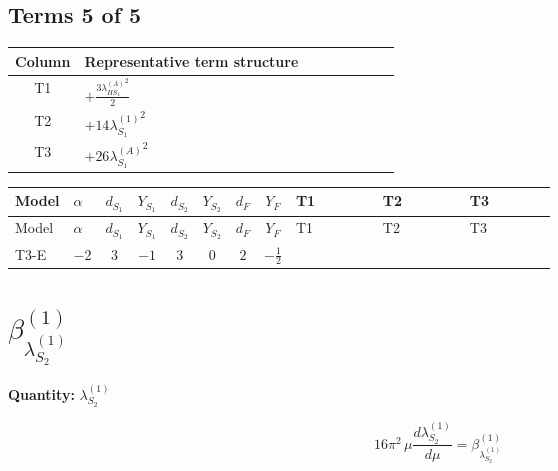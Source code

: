 \documentclass[8pt]{article}
\begin{document}
\begin{landscape}
\subsection*{Terms 5 of 5}
\begin{center}
\begin{tabular}{@{}c >{\raggedright\arraybackslash}p{0.82\linewidth}@{}}
\toprule
Column & Representative term structure \\
\midrule
T1 & \(\displaystyle +\frac{3 {\lambda_{HS_1}^{(A)}}^2}{2}\) \\
\midrule
T2 & \(\displaystyle +14 {\lambda_{S_1}^{(1)}}^2\) \\
\midrule
T3 & \(\displaystyle +26 {\lambda_{S_1}^{(A)}}^2\) \\
\midrule
\bottomrule
\end{tabular}
\end{center}
\smallskip
\tiny
\begin{longtable}{@{}llcccccc >{\raggedright\arraybackslash}p{0.21\linewidth} >{\raggedright\arraybackslash}p{0.21\linewidth} >{\raggedright\arraybackslash}p{0.21\linewidth}@{}}
\toprule
Model & $\alpha$ & $d_{S_1}$ & $Y_{S_1}$ & $d_{S_2}$ & $Y_{S_2}$ & $d_F$ & $Y_F$ & T1 & T2 & T3 \\
\midrule
\endfirsthead
\toprule
Model & $\alpha$ & $d_{S_1}$ & $Y_{S_1}$ & $d_{S_2}$ & $Y_{S_2}$ & $d_F$ & $Y_F$ & T1 & T2 & T3 \\
\midrule
\endhead
T3-E & $-2$ & $3$ & $-1$ & $3$ & $0$ & $2$ & $-\frac{1}{2}$ & \scriptsize\adjustbox{max width=\linewidth}{$\begin{gathered} +\frac{3 {\lambda_{HS_1}^{(A)}}^2}{2}\end{gathered}$} & \scriptsize\adjustbox{max width=\linewidth}{$\begin{gathered} +14 {\lambda_{S_1}^{(1)}}^2\end{gathered}$} & \scriptsize\adjustbox{max width=\linewidth}{$\begin{gathered} +26 {\lambda_{S_1}^{(A)}}^2\end{gathered}$} \\
\midrule
\bottomrule
\end{longtable}
\clearpage
\section*{$\beta_{\lambda_{S_2}^{(1)}}^{(1)}$}
\noindent\textbf{Quantity: }$\lambda_{S_2}^{(1)}$\par\smallskip
\[16\pi^2\,\mu\frac{d \lambda_{S_2}^{(1)}}{d\mu}=\beta_{\lambda_{S_2}^{(1)}}^{(1)}\]

\end{landscape}
\end{document}
